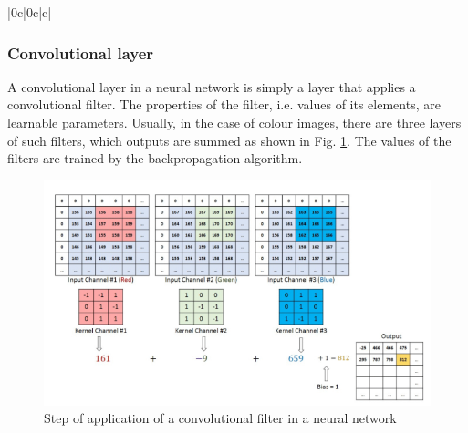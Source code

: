 \begin{table}[h]
\begin{center}
\begin{tabular}{ |0c|0c|c|}
\hline
\end{tabular}
\caption[convo]{Examplary convolutional kernels applied on an image\footnotemark. }
  \label{tab:classical_kernel}
\end{center}
\end{table}




\subsubsection{Convolutional layer}

A convolutional layer in a neural network is simply a layer that applies a convolutional filter. The properties of the filter, i.e. values of its elements, are learnable parameters.
Usually, in the case of colour images, there are three layers of such filters, which outputs are summed as shown in Fig. \ref{fig:conv_layer}.
The values of the filters are trained by the backpropagation algorithm.

\begin{figure}
  \centering
  \includegraphics[width=0.9\linewidth]{figures/chapter3/convo_steps.png}
  \caption{Step of application of a convolutional filter in a neural network \protect\footnotemark}
  \label{fig:conv_layer}
\end{figure}


